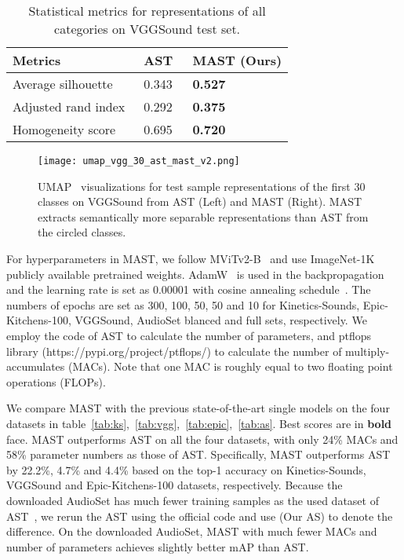 \documentclass{article}
\begin{document}
\begin{table}[h]\centering
\caption{Statistical metrics for representations of all categories on VGGSound test set.}\label{tab:vgg_feat_ablation}
    \begin{tabular}{l|ll}
	\toprule
	 Metrics & AST~\cite{gong2021ast} & MAST (Ours) \\ \midrule
Average silhouette~\cite{rousseeuw1987silhouettes} & 0.343 &  \textbf{0.527}  \\  Adjusted rand index~\cite{hubert1985comparing} & 0.292 &  \textbf{0.375}  \\
	Homogeneity score~\cite{rosenberg2007v} &0.695 &\textbf{0.720} \\
\bottomrule
		\end{tabular}
\end{table}
\begin{figure}[h]
	\centering  \texttt{[image: umap\_vgg\_30\_ast\_mast\_v2.png]}
	\caption{UMAP~\cite{mcinnes2018umap} visualizations for test sample representations of the first 30 classes on VGGSound from AST (Left) and MAST (Right). MAST extracts semantically more separable representations than AST from the circled classes.}  \label{fig:umap}
\end{figure}

For hyperparameters in MAST, we follow MViTv2-B~\cite{li2021improved} and use ImageNet-1K publicly available pretrained weights. AdamW~\cite{loshchilov2018decoupled} is used in the backpropagation and the learning rate is set as 0.00001 with cosine annealing schedule~\cite{loshchilov2016sgdr}. The numbers of epochs are set as 300, 100, 50, 50 and 10 for Kinetics-Sounds, Epic-Kitchens-100, VGGSound, AudioSet blanced and full sets, respectively. We employ the code of AST to calculate the number of parameters, and ptflops library (https://pypi.org/project/ptflops/) to calculate the number of multiply-accumulates (MACs). Note that one MAC is roughly equal to two floating point operations (FLOPs).

We compare MAST with the previous state-of-the-art single models on the four datasets in table~\ref{tab:ks},~\ref{tab:vgg},~\ref{tab:epic},~\ref{tab:as}. Best scores are in \textbf{bold} face. MAST outperforms AST on all the four datasets, with only 24\% MACs and 58\% parameter numbers as those of AST. Specifically, MAST outperforms AST by 22.2\%, 4.7\% and 4.4\% based on the top-1 accuracy on Kinetics-Sounds, VGGSound and Epic-Kitchens-100 datasets, respectively. Because the downloaded AudioSet has much fewer training samples as the used dataset of AST~\cite{gong2021ast}, we rerun the AST using the official code and use (Our AS) to denote the difference. On the downloaded AudioSet, MAST with much fewer MACs and number of parameters achieves slightly better mAP than AST. 
\end{document}
